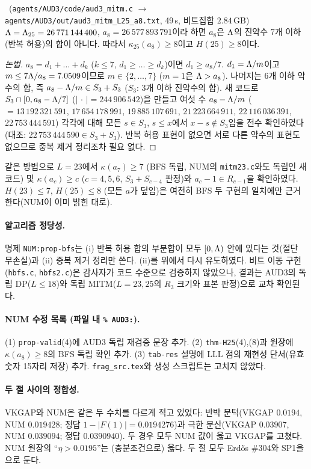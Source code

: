 \begin{proposition}[$H(25)\ge8$의 BFS 독립 확인]\label{AUD3:prop-a8}
\NUMERIC\ (\texttt{agents/AUD3/code/aud3\_mitm.c} $\to$ \texttt{agents/AUD3/out/aud3\_mitm\_L25\_a8.txt}, 49\,s, 비트집합 $2.84$\,GB)
$\Lambda=\Lambda_{25}=26\,771\,144\,400$, $a_8=26\,577\,893\,791$이라 하면 $a_8$은 $\Lambda$의 진약수 $7$개 이하(반복 허용)의 합이 아니다. 따라서 $\kappa_{25}(a_8)\ge8$이고 $H(25)\ge8$이다.
\end{proposition}
\begin{proof}[논법]
$a_8=d_1+\dots+d_k$ ($k\le7$, $d_1\ge\dots\ge d_k$)이면 $d_1\ge a_8/7$. $d_1=\Lambda/m$이고 $m\le7\Lambda/a_8=7.0509$이므로 $m\in\{2,\dots,7\}$ ($m=1$은 $\Lambda>a_8$).
나머지는 $6$개 이하 약수의 합, 즉 $a_8-\Lambda/m\in S_3+S_3$ ($S_3$: $3$개 이하 진약수의 합). 새 코드로 $S_3\cap[0,a_8-\Lambda/7]$ ($|\,\cdot\,|=244\,906\,542$)을 만들고
여섯 수 $a_8-\Lambda/m$ ($=13\,192\,321\,591$, $17\,654\,178\,991$, $19\,885\,107\,691$, $21\,223\,664\,911$, $22\,116\,036\,391$, $22\,753\,444\,591$) 각각에 대해
모든 $s\in S_3$, $s\le x$에서 $x-s\notin S_3$임을 전수 확인하였다(대조: $22\,753\,444\,590\in S_3+S_3$).
반복 허용 표현이 없으면 서로 다른 약수의 표현도 없으므로 중복 제거 정리조차 필요 없다.
\end{proof}
같은 방법으로 $L=23$에서 $\kappa(a_7)\ge7$ (BFS 독립, NUM의 \texttt{mitm23.c}와도 독립인 새 코드) 및 $\kappa(a_c)\ge c$ ($c=4,5,6$, $S_3+S_{c-4}$ 판정)와 $a_c-1\in R_{c-1}$을 확인하였다.
$H(23)\le7$, $H(25)\le8$ (모든 $a$가 덮임)은 여전히 BFS 두 구현의 일치에만 근거한다(NUM이 이미 밝힌 대로).

\paragraph{알고리즘 정당성.}
명제 \texttt{NUM:prop-bfs}는 (i) 반복 허용 합의 부분합이 모두 $[0,\Lambda)$ 안에 있다는 것(절단 무손실)과 (ii) 중복 제거 정리만 쓴다. (ii)를 위에서 다시 유도하였다.
비트 이동 구현(\texttt{hbfs.c}, \texttt{hbfs2.c})은 감사자가 코드 수준으로 검증하지 않았으나, 결과는 AUD3의 독립 DP($L\le18$)와 독립 MITM($L=23,25$의 $R_3$ 크기와 표본 판정)으로 교차 확인된다.

\paragraph{NUM 수정 목록 (파일 내 \texttt{\% AUD3:}).}
(1) \texttt{prop-valid}(4)에 AUD3 독립 재검증 문장 추가. (2) \texttt{thm-H25}(4),(8)과 원장에 $\kappa(a_8)\ge8$의 BFS 독립 확인 추가.
(3) \texttt{tab-res} 설명에 LLL 점의 재현성 단서(유효숫자 15자리 저장) 추가. \texttt{frag\_src.tex}와 생성 스크립트는 고치지 않았다.

\paragraph{두 절 사이의 정합성.}
VKGAP와 NUM은 같은 두 수치를 다르게 적고 있었다: 반박 문턱(VKGAP $0.0194$, NUM $0.019428$; 정답 $1-|F(1)|=0.0194276$)과 극한 분산(VKGAP $0.03907$, NUM $0.039094$; 정답 $0.0390940$).
두 경우 모두 NUM 값이 옳고 VKGAP를 고쳤다. NUM 원장의 ``$\eta>0.0195$''는 (충분조건으로) 옳다. 두 절 모두 Erdős \#304와 SP1을 \OPEN{}으로 둔다.
